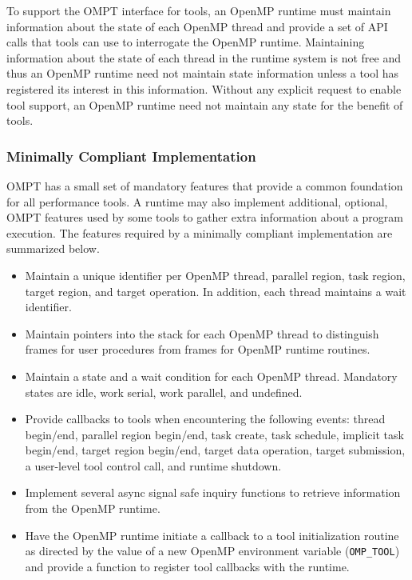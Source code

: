 \documentclass{article}
\begin{document}
To support the OMPT interface for tools, an OpenMP runtime must maintain information about the state of each OpenMP thread and provide a set of API calls that tools can use to interrogate the OpenMP runtime. Maintaining information about the state of each thread in the runtime system is not free and thus an OpenMP runtime need not maintain state information unless a tool has registered its interest in this information.
Without any explicit request to enable tool support, an OpenMP runtime need not maintain any state for the benefit of tools.

\subsubsection{Minimally Compliant Implementation}

OMPT has a small set of mandatory features that provide a common foundation for all performance tools. A runtime may also implement additional, optional, OMPT features used by some tools to gather extra information about a program execution.     
The features required by a minimally compliant implementation are summarized below.

\begin{itemize}
\item Maintain a unique identifier per OpenMP thread, parallel region, task region, target region, and target operation. In addition, each thread maintains a wait identifier.
\item Maintain pointers into the stack for each OpenMP thread to distinguish frames for user procedures from frames for OpenMP runtime routines.  
\item Maintain a state and a wait condition for each OpenMP thread. Mandatory states are idle, work serial, work parallel, and undefined.
\item Provide callbacks to tools when encountering the following  events:  thread begin/end, parallel region begin/end, task create, task schedule, implicit task begin/end, target region begin/end, target data operation, target submission, a user-level tool control call, and runtime shutdown.
\item Implement several async signal safe inquiry functions to retrieve information from the OpenMP runtime.
\item Have the OpenMP runtime initiate a callback to a tool initialization routine 
as directed by the value of a new OpenMP environment variable (\verb|OMP_TOOL|) and provide a function to register tool callbacks with the runtime.
\end{itemize}
\end{document}
